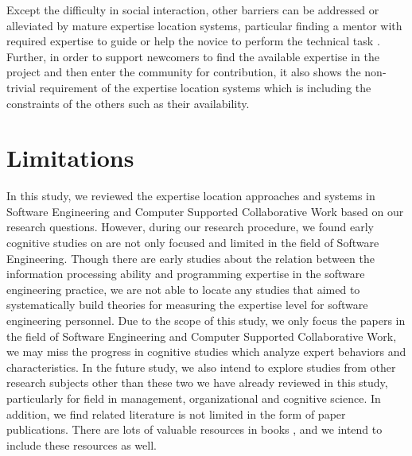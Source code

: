Except the difficulty in social interaction, other barriers can be addressed or alleviated by mature expertise location systems, particular finding a mentor with required expertise to guide or help the novice to perform the technical task \cite{begel2008novice}. Further, in order to support newcomers to find the available expertise in the project and then enter the community for contribution, it also shows the non-trivial requirement of the expertise location systems which is including the constraints of the others such as their availability.


\section{Limitations}

In this study, we reviewed the expertise location approaches and systems in Software Engineering and Computer Supported Collaborative Work based on our research questions. However, during our research procedure, we found early cognitive studies on are not only focused and limited in the field of Software Engineering. Though there are early studies about the relation between the information processing ability and programming expertise in the software engineering practice, we are not able to locate any studies that aimed to systematically build theories for measuring the expertise level for software engineering personnel. Due to the scope of this study, we only focus the papers in the field of Software Engineering and Computer Supported Collaborative Work, we may miss the progress in cognitive studies which analyze expert behaviors and characteristics. In the future study, we also intend to explore studies from other research subjects other than these two we have already reviewed in this study, particularly for field in management, organizational and cognitive science. In addition, we find related literature is not limited in the form of paper publications. There are lots of valuable resources in books \cite{ericsson2006cambridge, Simon:1996:SA:237774}, and we intend to include these resources as well.